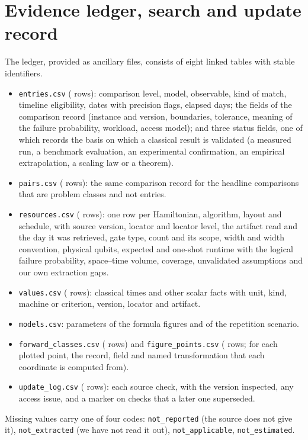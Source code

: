 
\section{Evidence ledger, search and update record}
\label{app:ledger}
The ledger, provided as ancillary files, consists of eight linked tables with stable identifiers.
\begin{itemize}
\item \texttt{entries.csv} (\nEntries{} rows): comparison level, model, observable, kind of match, timeline eligibility, dates with precision flags, elapsed days; the fields of the comparison record (instance and version, boundaries, tolerance, meaning of the failure probability, workload, access model); and three status fields, one of which records the basis on which a classical result is validated (a measured run, a benchmark evaluation, an experimental confirmation, an empirical extrapolation, a scaling law or a theorem).
\item \texttt{pairs.csv} (\nPairs{} rows): the same comparison record for the headline comparisons that are problem classes and not entries.
\item \texttt{resources.csv} (\nResources{} rows): one row per Hamiltonian, algorithm, layout and schedule, with source version, locator and locator level, the artifact read and the day it was retrieved, gate type, count and its scope, width and width convention, physical qubits, expected and one-shot runtime with the logical failure probability, space--time volume, coverage, unvalidated assumptions and our own extraction gaps.
\item \texttt{values.csv} (\nValues{} rows): classical times and other scalar facts with unit, kind, machine or criterion, version, locator and artifact.
\item \texttt{models.csv}: parameters of the formula figures and of the repetition scenario.
\item \texttt{forward\_classes.csv} (\nClasses{} rows) and \texttt{figure\_points.csv} (\nPoints{} rows; for each plotted point, the record, field and named transformation that each coordinate is computed from).
\item \texttt{update\_log.csv} (\nLog{} rows): each source check, with the version inspected, any access issue, and a marker on checks that a later one superseded.
\end{itemize}
Missing values carry one of four codes: \texttt{not\_reported} (the source does not give it), \texttt{not\_extracted} (we have not read it out), \texttt{not\_applicable}, \texttt{not\_estimated}.

